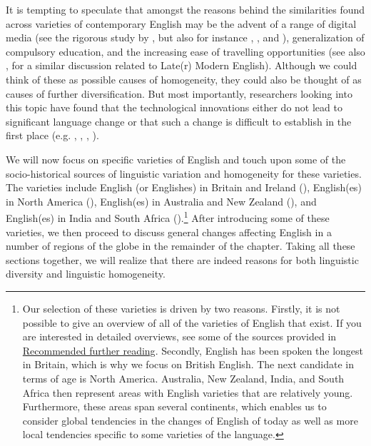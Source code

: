 It is tempting to speculate that amongst the reasons behind the similarities found across varieties of contemporary English may be the advent of a range of digital media (see the rigorous study by \citealp{StuartSmithPryceTimmins2013}, but also for instance \citealp{Androutsopoulos2013}, \citealp{Tagliamonte2014}, and \citealp{TagliamonteDenis2008}), generalization of compulsory education, and the increasing ease of travelling opportunities (see also \citealp[Chapter 1]{Beal2004}, for a similar discussion related to Late(r) Modern English). Although we could think of these as possible causes of homogeneity, they could also be thought of as causes of further diversification. But most importantly, researchers looking into this topic have found that the technological innovations either do not lead to significant language change or that such a change is difficult to establish in the first place (e.g. \citealp{Androutsopoulos2013}, \citealp{StuartSmithPryceTimmins2013}, \citealp{Tagliamonte2014}, \citealp{Trudgill2014}).

We will now focus on specific varieties of English and touch upon some of the socio-historical sources of linguistic variation and homogeneity for these varieties. The varieties include English (or Englishes) in Britain and Ireland (), English(es) in North America (), English(es) in Australia and New Zealand (), and English(es) in India and South Africa ().\footnote{Our selection of these varieties is driven by two reasons. Firstly, it is not possible to give an overview of all of the varieties of English that exist. If you are interested in detailed overviews, see some of the sources provided in \hyperref[PDE-reading]{Recommended further reading}. Secondly, English has been spoken the longest in Britain, which is why we focus on British English. The next candidate in terms of age is North America. Australia, New Zealand, India, and South Africa then represent areas with English varieties that are relatively young. Furthermore, these areas span several continents, which enables us to consider global tendencies in the changes of English of today as well as more local tendencies specific to some varieties of the language.} After introducing some of these varieties, we then proceed to discuss general changes affecting English in a number of regions of the globe in the remainder of the chapter. Taking all these sections together, we will realize that there are indeed reasons for both linguistic diversity and linguistic homogeneity.

